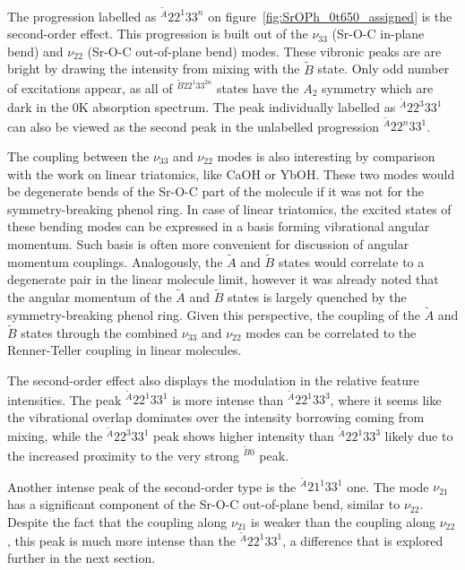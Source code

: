 \documentclass{article}
\begin{document}
The progression labelled as $^{\tilde{A}}22 ^1 33 ^n$ on
figure~\ref{fig:SrOPh_0t650_assigned} is the second-order effect. This
progression is built out of the $\nu _{33}$ (Sr-O-C in-plane bend) and $\nu
_{22}$ (Sr-O-C out-of-plane bend) modes. These vibronic peaks are are bright by
drawing the intensity from mixing with the $\tilde{B}$ state. Only odd number
of excitations appear, as all of $^{\tilde{B}22 ^1 33 ^{2n}}$ states have the
$A _2$ symmetry which are dark in the 0K absorption spectrum. The peak
individually labelled as $^{\tilde{A}}22^3 33^1$ can also be viewed as the
second peak in the unlabelled progression $^{\tilde{A}}22^n 33^1$.

The coupling between the $\nu _{33}$ and $\nu _{22}$ modes is also interesting
by comparison with the work on linear triatomics, like CaOH or YbOH. These two
modes would be degenerate bends of the Sr-O-C part of the molecule if it was
not for the symmetry-breaking phenol ring. In case of linear triatomics, the
excited states of these bending modes can be expressed in a basis forming
vibrational angular momentum. Such basis is often more convenient for
discussion of angular momentum
couplings.\autocite{pilgramProductionCharacterizationYtterbium2022}
Analogously, the $\tilde{A}$ and $\tilde{B}$ states would correlate to a
degenerate pair in the linear molecule limit, however it was already noted that
the angular momentum of the $\tilde{A}$ and $\tilde{B}$ states is largely
quenched by the symmetry-breaking phenol ring.\autocite{Augenbraun:CaOPh:2022}
Given this perspective, the coupling of the $\tilde{A}$ and $\tilde{B}$ states
through the combined $\nu _{33}$ and $\nu _{22}$ modes can be correlated to the
Renner-Teller coupling in linear molecules. 

The second-order effect also displays the modulation in the relative feature
intensities. The peak $^{\tilde{A}} 22^1 33^1$ is more intense than
$^{\tilde{A}} 22^1 33^3$, where it seems like the vibrational overlap dominates
over the intensity borrowing coming from mixing, while the $^{\tilde{A}} 22^3
33^1$ peak shows higher intensity than $^{\tilde{A}} 22^1 33^3$ likely due to
the increased proximity to the very strong $^{\tilde{B}0}$ peak. 

Another intense peak of the second-order type is the $^{\tilde{A}} 21^1 33^1$
one. The mode $\nu _{21}$ has a significant component of the Sr-O-C
out-of-plane bend, similar to $\nu _{22}$. Despite the fact that the coupling
along $\nu _{21}$ is weaker than the coupling along $\nu _{22}$, this peak is
much more intense than the $^{\tilde{A}} 22^1 33^1$, a difference that is
explored further in the next section.
\end{document}
